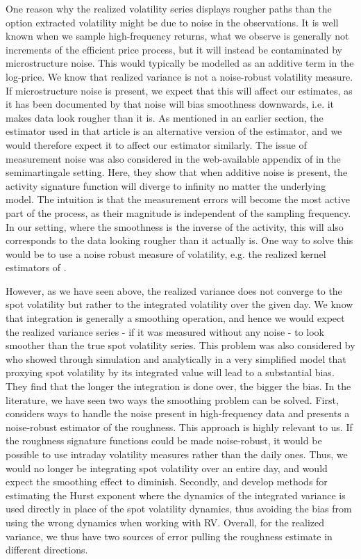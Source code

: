 \documentclass[fleqn,11pt,letterpaper]{article}
\theoremstyle{plain}
\theoremstyle{definition}
\theoremstyle{remark}
\numberwithin{equation}{section}
\begin{document}
One reason why the realized volatility series displays rougher paths than the option extracted volatility might be due to noise in the observations. It is well known when we sample high-frequency returns, what we observe is generally not increments of the efficient price process, but it will instead be contaminated by microstructure noise. This would typically be modelled as an additive term in the log-price. We know that realized variance is not a noise-robust volatility measure. If microstructure noise is present, we expect that this will affect our estimates, as it has been documented by \cite{Bennedsen2020} that noise will bias smoothness downwards, i.e. it makes data look rougher than it is. As mentioned in an earlier section, the estimator used in that article is an alternative version of the \cite{Corcuera2013} estimator, and we would therefore expect it to affect our estimator similarly. The issue of measurement noise was also considered in the web-available appendix of \cite{Todorov2010} in the semimartingale setting. Here, they show that when additive noise is present, the activity signature function will diverge to infinity no matter the underlying model. The intuition is that the measurement errors will become the most active part of the process, as their magnitude is independent of the sampling frequency. In our setting, where the smoothness is the inverse of the activity, this will also corresponds to the data looking rougher than it actually is. One way to solve this would be to use a noise robust measure of volatility, e.g. the realized kernel estimators of \cite{Barndorff-Nielsen2008}.

However, as we have seen above, the realized variance does not converge to the spot volatility but rather to the integrated volatility over the given day. We know that integration is generally a smoothing operation, and hence we would expect the realized variance series - if it was measured without any noise - to look smoother than the true spot volatility series. This problem was also considered by \cite{Gatheral2018} who showed through simulation and analytically in a very simplified model that proxying spot volatility by its integrated value will lead to a substantial bias. They find that the longer the integration is done over, the bigger the bias. In the literature, we have seen two ways the smoothing problem can be solved. First, \cite{Bennedsen2020} considers ways to handle the noise present in high-frequency data and presents a noise-robust estimator of the roughness. This approach is highly relevant to us. If the roughness signature functions could be made noise-robust, it would be possible to use intraday volatility measures rather than the daily ones. Thus, we would no longer be integrating spot volatility over an entire day, and would expect the smoothing effect to diminish. Secondly, \cite{Fukasawa2019} and \cite{BCSV2020} develop methods for estimating the Hurst exponent where the dynamics of the integrated variance is used directly in place of the spot volatility dynamics, thus avoiding the bias from using the wrong dynamics when working with RV. Overall, for the realized variance, we thus have two sources of error pulling the roughness estimate in different directions. 
\end{document}
